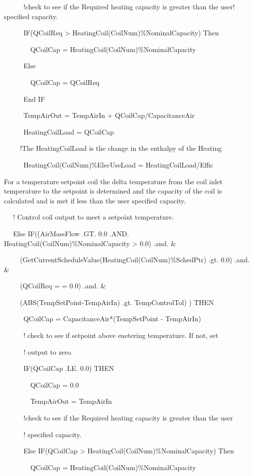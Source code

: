 ~ ~~~~!check to see if the Required heating capacity is greater than the user! specified capacity.

~~~~~ IF(QCoilReq \textgreater{} HeatingCoil(CoilNum)\%NominalCapacity) Then

~~~~~~~ QCoilCap = HeatingCoil(CoilNum)\%NominalCapacity

~~~~~ Else

~~~~~~~ QCoilCap = QCoilReq

~~~~~ End IF

~~~~~ TempAirOut = TempAirIn + QCoilCap/CapacitanceAir

~~~~~ HeatingCoilLoad = QCoilCap

~~~~ !The HeatingCoilLoad is the change in the enthalpy of the Heating

~~~~~ HeatingCoil(CoilNum)\%ElecUseLoad = HeatingCoilLoad/Effic

For a temperature setpoint coil the delta temperature from the coil inlet temperature to the setpoint is determined and the capacity of the coil is calculated and is met if less than the user specified capacity.

~~ ! Control coil output to meet a setpoint temperature.

~~ Else IF((AirMassFlow .GT. 0.0 .AND. HeatingCoil(CoilNum)\%NominalCapacity \textgreater{} 0.0) .and. \&

~~~~ (GetCurrentScheduleValue(HeatingCoil(CoilNum)\%SchedPtr) .gt. 0.0) .and. \&

~~~~ (QCoilReq = = 0.0) .and. \&

~~~~ (ABS(TempSetPoint-TempAirIn) .gt. TempControlTol) ) THEN

~~~~~ QCoilCap = CapacitanceAir*(TempSetPoint - TempAirIn)

~~~~~ ! check to see if setpoint above enetering temperature. If not, set

~~~~~ ! output to zero.

~~~~~ IF(QCoilCap .LE. 0.0) THEN

~~~~~~~ QCoilCap = 0.0

~~~~~~~ TempAirOut = TempAirIn

~~~~~ !check to see if the Required heating capacity is greater than the user

~~~~~ ! specified capacity.

~~~~~ Else IF(QCoilCap \textgreater{} HeatingCoil(CoilNum)\%NominalCapacity) Then

~~~~~~~ QCoilCap = HeatingCoil(CoilNum)\%NominalCapacity

